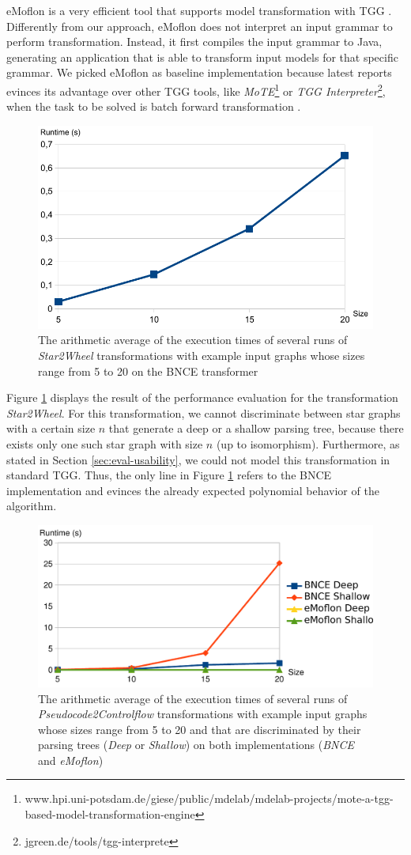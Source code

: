 eMoflon is a very efficient tool that supports model transformation with TGG \cite{leblebici2014developing}. Differently from our approach, eMoflon does not interpret an input grammar to perform transformation. Instead, it first compiles the input grammar to Java, generating an application that is able to transform input models for that specific grammar. We picked eMoflon as baseline implementation because latest reports evinces its advantage over other TGG tools, like \emph{MoTE}\footnote{www.hpi.uni-potsdam.de/giese/public/mdelab/mdelab-projects/mote-a-tgg-based-model-transformation-engine} or \emph{TGG Interpreter}\footnote{jgreen.de/tools/tgg-interprete}, when the task to be solved is batch forward transformation \cite{hildebrandt2013survey, leblebici2014comparison}.

\begin{figure}
	\centering
	\includegraphics[width=.45\textwidth]{figures/performance/star2wheel}
	\caption{The arithmetic average of the execution times of several runs of \emph{Star2Wheel} transformations with example input graphs whose sizes range from 5 to 20 on the BNCE transformer}
	\label{fig:performance-star2wheel}
\end{figure}

Figure \ref{fig:performance-star2wheel} displays the result of the performance evaluation for the transformation \emph{Star2Wheel}. For this transformation, we cannot discriminate between star graphs with a certain size $n$ that generate a deep or a shallow parsing tree, because there exists only one such star graph with size $n$ (up to isomorphism). Furthermore, as stated in Section \ref{sec:eval-usability}, we could not model this transformation in standard TGG. Thus, the only line in Figure \ref{fig:performance-star2wheel} refers to the BNCE implementation and evinces the already expected polynomial behavior of the algorithm.

\begin{figure}
	\centering
	\includegraphics[width=.6\textwidth]{figures/performance/pseudocode2controlflow}
	\caption{The arithmetic average of the execution times of several runs of \emph{Pseudocode2Controlflow} transformations with example input graphs whose sizes range from 5 to 20 and that are discriminated by their parsing trees (\emph{Deep} or \emph{Shallow}) on both implementations (\emph{BNCE} and \emph{eMoflon})}
	\label{fig:performance-pseudocode2controlflow}
\end{figure}

